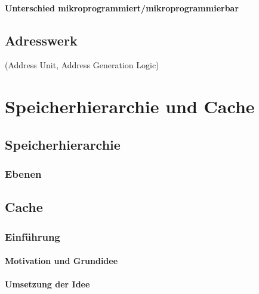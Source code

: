 \subsubsection{Unterschied mikroprogrammiert/mikroprogrammierbar}

\section{Adresswerk}
(Address Unit, Address Generation Logic)


\chapter{Speicherhierarchie und Cache}
\section{Speicherhierarchie}

\subsection{Ebenen}

\section{Cache}
\subsection{Einführung}
\subsubsection{Motivation und Grundidee}

\subsubsection{Umsetzung der Idee}

